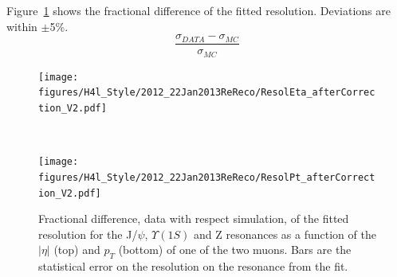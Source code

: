 Figure~\ref{fig:ResolDATAMC_8TeV} shows the fractional difference of the fitted resolution.
Deviations are within $\pm$5\%.
\[
\frac{\sigma_{DATA}-\sigma_{MC}}{\sigma_{MC}}
\]
\begin{figure}[hbtp]  
\begin{center}
\texttt{[image: figures/H4l\_Style/2012\_22Jan2013ReReco/ResolEta\_afterCorrection\_V2.pdf]}
\end{center}\\
\begin{center}
\texttt{[image: figures/H4l\_Style/2012\_22Jan2013ReReco/ResolPt\_afterCorrection\_V2.pdf]} 
\end{center}
 \hspace{1cm} 
   \caption{Fractional difference, data with respect simulation, of the fitted resolution for the J/$\psi$,
     $\Upsilon(1S)$ and Z resonances as a function of the $|\eta|$ (top)
     and $p_T$ (bottom) of one of the two muons. Bars are the
     statistical error on the resolution on the resonance from the fit.
   \label{fig:ResolDATAMC_8TeV}}
\end{figure} 


